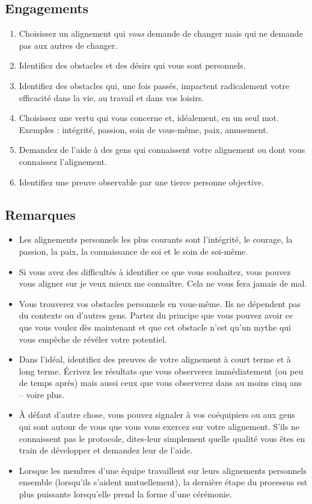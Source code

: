 \documentclass[paper=6in:9in,pagesize=pdftex,headinclude=on,footinclude=on,12pt]{scrbook}
\begin{document}
\subsection{Engagements}
\begin{enumerate}
	\item Choisissez un alignement qui \emph{vous} demande de changer mais qui ne demande pas aux autres de changer.
	\item Identifiez des obstacles et des désirs qui vous sont personnels.
	\item Identifiez des obstacles qui, une fois passés, impactent radicalement votre efficacité dans la vie, au travail et dans vos loisirs.
	\item Choisissez une vertu qui vous concerne et, idéalement, en un seul mot. Exemples : intégrité, passion, soin de vous-même, paix, amusement.
	\item Demandez de l'aide à des gens qui connaissent votre alignement ou dont vous connaissez l'alignement.
	\item Identifiez une preuve observable par une tierce personne objective.
\end{enumerate}

\subsection{Remarques}
\begin{itemize}
	\item Les alignements personnels les plus courants sont l'intégrité, le courage, la passion, la paix, la connaissance de soi et le soin de soi-même.
	\item Si vous avez des difficultés à identifier ce que vous souhaitez, vous pouvez vous aligner sur \og{}je veux mieux me connaître\fg{}. Cela ne vous
	      fera jamais de mal.
	\item Vous trouverez vos obstacles personnels en vous-même. Ils ne dépendent pas du contexte ou d'autres gens. Partez du principe que vous pouvez avoir ce
	      que vous voulez dès maintenant et que cet obstacle n'est qu'un mythe qui vous empêche de révéler votre potentiel.
	\item Dans l'idéal, identifiez des preuves de votre alignement à court terme et à long terme. Écrivez les résultats que vous observerez immédiatement (ou
	      peu de temps après) mais aussi ceux que vous observerez dans au moins cinq ans -- voire plus.
	\item À défaut d'autre chose, vous pouvez signaler à vos coéquipiers ou aux gens qui sont autour de vous que vous vous exercez sur votre alignement.
	      S'ils ne connaissent pas le protocole, dites-leur simplement quelle qualité vous êtes en train de développer et demandez leur de l'aide.
	\item Lorsque les membres d'une équipe travaillent sur leurs alignements personnels ensemble (lorsqu'ils s'aident mutuellement), la dernière étape du
	      processus est plus puissante lorsqu'elle prend la forme d'une cérémonie.
\end{itemize}
\end{document}

